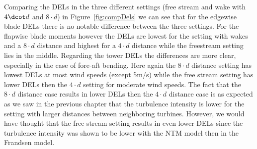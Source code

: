 \documentclass[10pt]{article}
\begin{document}
Comparing the DELs in the three different settings (free stream and wake with $4\dcot d$ and $8\cdot d$) in Figure~\ref{fig:compDels} we can see that for the edgewise blade DELs there is no notable difference between the three settings. For the flapwise blade moments however the DELs are lowest for the setting with wakes and a $8\cdot d$ distance and highest for a $4\cdot d$ distance while the freestream setting lies in the middle.
Regarding the tower DELs the differences are more clear, especially in the case of fore-aft bending. Here again the $8\cdot d$ distance setting has lowest DELs at most wind speeds (except 5m/s) while the free stream setting has lower DELs then the $4\cdot d$ setting for moderate wind speeds.
The fact that the $8\cdot d$ distance case results in lower DELs then the $4\cdot d$ distance case is as expected as we saw in the previous chapter that the turbulence intensity is lower for the setting with larger distances between neighboring turbines. However, we would have thought that the free stream setting results in even lower DELs since the turbulence intensity was shown to be lower with the NTM model then in the Frandsen model. 
\end{document}
